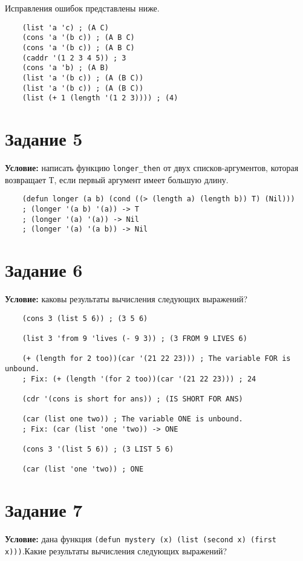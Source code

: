 Исправления ошибок представлены ниже.

\begin{lstlisting}
	(list 'a 'c) ; (A C)
	(cons 'a '(b c)) ; (A B C)
	(cons 'a '(b c)) ; (A B C)
	(caddr '(1 2 3 4 5)) ; 3
	(cons 'a 'b) ; (A B)
	(list 'a '(b c)) ; (A (B C))
	(list 'a '(b c)) ; (A (B C))
	(list (+ 1 (length '(1 2 3)))) ; (4)
\end{lstlisting}


\section{Задание 5}

\textbf{Условие:} написать функцию \texttt{longer\_then} от двух списков-аргументов, которая возвращает Т, если первый аргумент имеет большую длину.

\begin{lstlisting}
	(defun longer (a b) (cond ((> (length a) (length b)) T) (Nil)))
	; (longer '(a b) '(a)) -> T
	; (longer '(a) '(a)) -> Nil
	; (longer '(a) '(a b)) -> Nil
\end{lstlisting}


\section{Задание 6}

\textbf{Условие:} каковы результаты вычисления следующих выражений?

\begin{lstlisting}
	(cons 3 (list 5 6)) ; (3 5 6)

	(list 3 'from 9 'lives (- 9 3)) ; (3 FROM 9 LIVES 6)

	(+ (length for 2 too))(car '(21 22 23))) ; The variable FOR is unbound.
	; Fix: (+ (length '(for 2 too))(car '(21 22 23))) ; 24

	(cdr '(cons is short for ans)) ; (IS SHORT FOR ANS)

	(car (list one two)) ; The variable ONE is unbound.
	; Fix: (car (list 'one 'two)) -> ONE

	(cons 3 '(list 5 6)) ; (3 LIST 5 6)

	(car (list 'one 'two)) ; ONE
\end{lstlisting}


\section{Задание 7}

\textbf{Условие:} дана функция \texttt{(defun mystery (x) (list (second x) (first x)))}.Какие результаты вычисления следующих выражений? 

